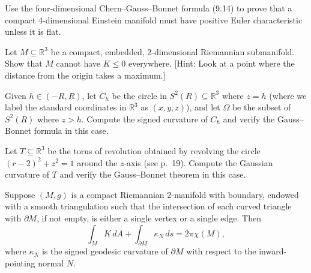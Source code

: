 \begin{exercise}
\label{prob:einstein-manifold-euler-characteristic}
Use the four-dimensional Chern--Gauss--Bonnet formula (9.14) to prove that
a compact 4-dimensional Einstein manifold must have positive Euler characteristic unless it is flat.
\end{exercise}

\begin{exercise}
\label{prob:embedded-submanifold-positive-curvature}
Let $M \subseteq \mathbb{R}^3$ be a compact, embedded, 2-dimensional Riemannian submanifold. Show that $M$ cannot have $K \leq 0$ everywhere. [Hint: Look at a point where the distance from the origin takes a maximum.]
\end{exercise}

\begin{exercise}
\label{prob:gauss-bonnet-sphere}
Given $h \in (-R, R)$, let $C_h$ be the circle in $S^2(R) \subseteq \mathbb{R}^3$ where $z = h$ (where we label the standard coordinates in $\mathbb{R}^3$ as $(x, y, z)$), and let $\Omega$ be the subset of $S^2(R)$ where $z > h$. Compute the signed curvature of $C_h$ and verify the Gauss--Bonnet formula in this case.
\end{exercise}

\begin{exercise}
\label{prob:gauss-bonnet-torus}
Let $T \subseteq \mathbb{R}^3$ be the torus of revolution obtained by revolving the circle $(r - 2)^2 + z^2 = 1$ around the $z$-axis (see p.\ 19). Compute the Gaussian curvature of $T$ and verify the Gauss--Bonnet theorem in this case.
\end{exercise}

\begin{exercise}
\label{prob:gauss-bonnet-with-boundary}
Suppose $(M, g)$ is a compact Riemannian 2-manifold with boundary, endowed
with a smooth triangulation such that the intersection of each curved triangle
with $\partial M$, if not empty, is either a single vertex or a single edge. Then
\[
\int_M K \, dA + \int_{\partial M} \kappa_N \, ds = 2\pi \chi(M),
\]
where $\kappa_N$ is the signed geodesic curvature of $\partial M$ with respect to the inward-pointing normal $N$.
\end{exercise}

